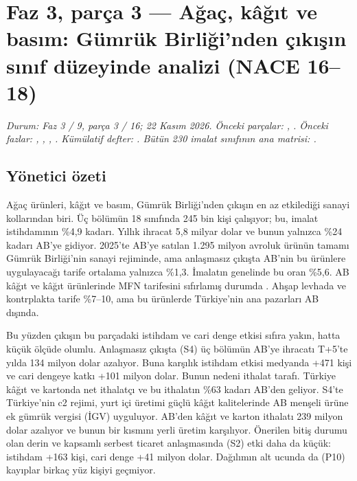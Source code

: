 \hypertarget{nace_kartlar_16-18}{%
\chapter{Faz 3, parça 3 --- Ağaç, kâğıt ve basım: Gümrük Birliği'nden çıkışın sınıf düzeyinde analizi (NACE 16--18)}\label{nace_kartlar_16-18}}

\emph{Durum: Faz 3 / 9, parça 3 / 16; 22 Kasım 2026. Önceki parçalar: , . Önceki fazlar: , , , . Kümülatif defter: . Bütün 230 imalat sınıfının ana matrisi: \href{../veri/nace_matris.csv}{}.}

\hypertarget{nace_kartlar_16-18-yuxf6netici-uxf6zeti}{%
\section{Yönetici özeti}\label{nace_kartlar_16-18-yuxf6netici-uxf6zeti}}

Ağaç ürünleri, kâğıt ve basım, Gümrük Birliği'nden çıkışın en az etkilediği sanayi kollarından biri. Üç bölümün 18 sınıfında 245 bin kişi çalışıyor; bu, imalat istihdamının \%4,9 kadarı. Yıllık ihracat 5,8 milyar dolar ve bunun yalnızca \%24 kadarı AB'ye gidiyor. 2025'te AB'ye satılan 1.295 milyon avroluk ürünün tamamı Gümrük Birliği'nin sanayi rejiminde, ama anlaşmasız çıkışta AB'nin bu ürünlere uygulayacağı tarife ortalama yalnızca \%1,3. İmalatın genelinde bu oran \%5,6. AB kâğıt ve kâğıt ürünlerinde MFN tarifesini sıfırlamış durumda \etiketV{}. Ahşap levhada ve kontrplakta tarife \%7--10, ama bu ürünlerde Türkiye'nin ana pazarları AB dışında.

Bu yüzden çıkışın bu parçadaki istihdam ve cari denge etkisi sıfıra yakın, hatta küçük ölçüde olumlu. Anlaşmasız çıkışta (S4) üç bölümün AB'ye ihracatı T+5'te yılda 134 milyon dolar azalıyor. Buna karşılık istihdam etkisi medyanda +471 kişi ve cari dengeye katkı +101 milyon dolar. Bunun nedeni ithalat tarafı. Türkiye kâğıt ve kartonda net ithalatçı ve bu ithalatın \%63 kadarı AB'den geliyor. S4'te Türkiye'nin c2 rejimi, yurt içi üretimi güçlü kâğıt kalitelerinde AB menşeli ürüne ek gümrük vergisi (İGV) uyguluyor. AB'den kâğıt ve karton ithalatı 239 milyon dolar azalıyor ve bunun bir kısmını yerli üretim karşılıyor. Önerilen bitiş durumu olan derin ve kapsamlı serbest ticaret anlaşmasında (S2) etki daha da küçük: istihdam +163 kişi, cari denge +41 milyon dolar. Dağılımın alt ucunda da (P10) kayıplar birkaç yüz kişiyi geçmiyor.

